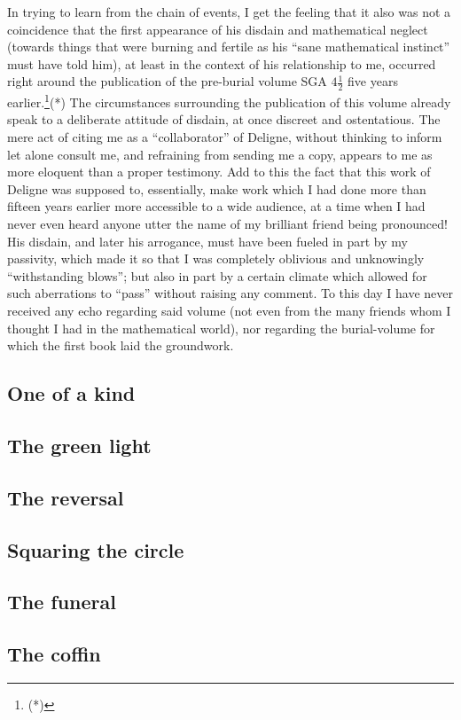 In trying to learn from the chain of events, I get the feeling that it also was not a
coincidence that the first appearance of his disdain and mathematical neglect (towards
things that were burning and fertile as his ``sane mathematical instinct'' must have told
him), at least in the context of his relationship to me, occurred right around the
publication of the pre-burial volume SGA $4\frac{1}{2}$ five years
earlier.\footnote{(*)}(*)
The circumstances surrounding the publication of this volume 
already speak to a deliberate attitude of disdain, at once discreet and ostentatious. 
The mere act of citing me as a ``collaborator'' of Deligne, without thinking to inform
let alone consult me, and refraining from sending me a copy, 
appears to me as more eloquent than a proper testimony. 
Add to this the fact that this work of Deligne was supposed to, essentially, make 
work which I had done more than fifteen years earlier
more accessible to a wide audience, at a time when I had never even
heard anyone utter the name of my brilliant friend being pronounced!
His disdain, and later his arrogance, must have been fueled in part by my passivity,
which made it so that I was completely oblivious and unknowingly 
``withstanding blows''; but also in part by a certain climate which allowed for such
aberrations to ``pass'' without raising any comment. 
To this day I have never received any echo regarding said volume (not even from the many
friends whom I thought I had in the mathematical world), 
nor regarding the burial-volume for which the first book laid the groundwork. 




\subsection{One of a kind}


\subsection{The green light}


\subsection{The reversal}


\subsection{Squaring the circle}


\subsection{The funeral}


\subsection{The coffin}



